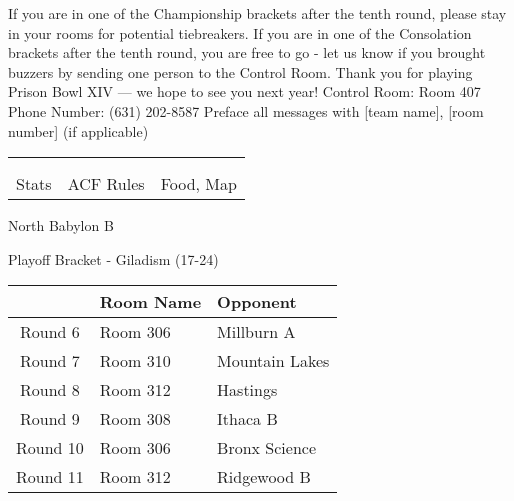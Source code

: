 \documentclass{article}%
\begin{document}
\vspace*{30pt}%
\linebreak%
If you are in one of the Championship brackets after the tenth round, please stay in your rooms for potential tiebreakers.\newline%
\newline%
If you are in one of the Consolation brackets after the tenth round, you are free to go {-} let us know if you brought buzzers by sending one person to the Control Room.\newline%
\newline%
Thank you for playing Prison Bowl XIV — we hope to see you next year!\newline%
\newline%
Control Room: Room 407\newline%
Phone Number: (631) 202{-}8587\newline%
Preface all messages with {[}team name{]}, {[}room number{]} (if applicable)%
\vspace*{30pt}%
\newline%
%
\begin{tabularx}{\textwidth}{YYY}%
  &  &  \\%
\\%
Stats&ACF Rules&Food, Map\\%
\end{tabularx}%
\newpage%
\begin{center}%
\begin{Huge}%
North Babylon B%
\end{Huge}%
\vspace*{12pt}%
\linebreak%
\begin{Large}%
Playoff Bracket {-} Giladism (17{-}24)%
\end{Large}%
\end{center}%
\vspace*{4pt}%
%
\begin{tabularx}{\textwidth}{|c|Y|Y|}%
\hline%
&Room Name&Opponent\\%
\hline%
Round 6&Room 306&Millburn A\\%
Round 7&Room 310&Mountain Lakes\\%
Round 8&Room 312&Hastings\\%
Round 9&Room 308&Ithaca B\\%
Round 10&Room 306&Bronx Science\\%
Round 11&Room 312&Ridgewood B\\%
\hline%
\end{tabularx}%
\end{document}
